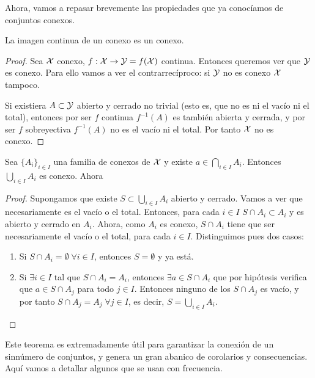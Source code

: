 Ahora, vamos a repasar brevemente las propiedades que ya conocíamos de conjuntos conexos.

\begin{prop}
	\label{conex_prop_im_continua}
	La imagen continua de un conexo es un conexo.
	
	\begin{proof}
		Sea $\mathcal{X}$ conexo, $f:\mathcal{X}\to\mathcal{Y}=f(\mathcal{X})$ continua. Entonces queremos ver que $\mathcal{Y}$ es conexo. Para ello vamos a ver el contrarrecíproco: si $\mathcal{Y}$ no es conexo $\mathcal{X}$ tampoco.
		
		Si existiera $A\subset\mathcal{Y}$ abierto y cerrado no trivial (esto es, que no es ni el vacío ni el total), entonces por ser $f$ continua $f^{-1}(A)$ es también abierta y cerrada, y por ser $f$ sobreyectiva $f^{-1}(A)$ no es el vacío ni el total. Por tanto $\mathcal{X}$ no es conexo.
	\end{proof}
\end{prop}

\begin{theo}
	\label{conex_theo_pivote}
	Sea $\{A_i\}_{i\in I}$ una familia de conexos de $\mathcal{X}$ y existe $a\in\bigcap_{i\in I} A_i$. Entonces $\bigcup_{i\in I} A_i$ es conexo. Ahora
	
	\begin{proof}
		Supongamos que existe $S\subset\bigcup_{i\in I} A_i$ abierto y cerrado. Vamos a ver que necesariamente es el vacío o el total. Entonces, para cada $i\in I$ $S\cap A_i\subset A_i$ y es abierto y cerrado en $A_i$. Ahora, como $A_i$ es conexo, $S\cap A_i$ tiene que ser necesariamente el vacío o el total, para cada $i\in I$. Distinguimos pues dos casos:
		\begin{enumerate}
			\item Si $S\cap A_i=\emptyset\;\forall i\in I$, entonces $S=\emptyset$ y ya está.
			\item Si $\exists i\in I$ tal que $S\cap A_i=A_i$, entonces $\exists a\in S\cap A_i$ que por hipótesis verifica que $a\in S\cap A_j$ para todo $j\in I$. Entonces ninguno de los $S\cap A_j$ es vacío, y por tanto $S\cap A_j=A_j\;\forall j\in I$, es decir, $S=\bigcup_{i\in I} A_i$. \qedhere
		\end{enumerate}
	\end{proof}
\end{theo}

Este teorema es extremadamente útil para garantizar la conexión de un sinnúmero de conjuntos, y genera un gran abanico de corolarios y consecuencias. Aquí vamos a detallar algunos que se usan con frecuencia.

